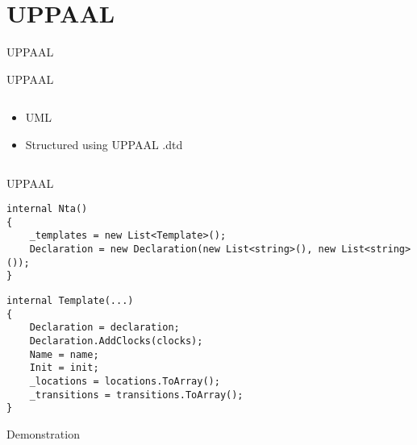 \section{UPPAAL}
\begin{frame}[shrink=5]{UPPAAL}
    \begin{center}
        
    \end{center}
\end{frame}
\begin{frame}{UPPAAL}
    \begin{columns}
        \begin{column}{0.4\textwidth}
            \begin{itemize}
                \item UML
                \item Structured using UPPAAL .dtd
            \end{itemize}
        \end{column}
        \begin{column}{0.6\textwidth}
            \scalebox{0.8}{
                
            }
        \end{column}
    \end{columns}

\end{frame}
\begin{frame}[fragile]{UPPAAL}

    \begin{lstlisting}[style=csharp]
internal Nta()
{
    _templates = new List<Template>();
    Declaration = new Declaration(new List<string>(), new List<string>());
}    
    \end{lstlisting}
    \vspace{1em}
    \begin{lstlisting}[style=csharp]
internal Template(...)
{
    Declaration = declaration;
    Declaration.AddClocks(clocks);
    Name = name;
    Init = init;
    _locations = locations.ToArray();
    _transitions = transitions.ToArray();
}  
    \end{lstlisting}
\end{frame}

\begin{frame}{Demonstration}

\end{frame}

